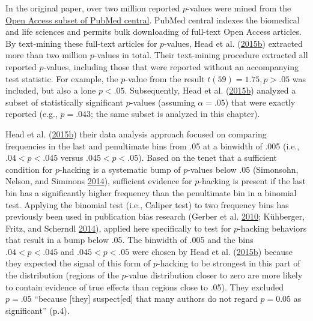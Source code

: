 \documentclass[a5paper]{book}
\begin{document}
In the original paper, over two million reported \(p\)-values were mined
from the \href{https://www.ncbi.nlm.nih.gov/pmc/tools/openftlist/}{Open
Access subset of PubMed central}. PubMed central indexes the biomedical
and life sciences and permits bulk downloading of full-text Open Access
articles. By text-mining these full-text articles for \(p\)-values, Head
et al.
(\protect\hyperlink{ref-doi:10.1371ux2fjournal.pbio.1002106}{2015}\protect\hyperlink{ref-doi:10.1371ux2fjournal.pbio.1002106}{b})
extracted more than two million \(p\)-values in total. Their text-mining
procedure extracted all reported \(p\)-values, including those that were
reported without an accompanying test statistic. For example, the
\(p\)-value from the result \(t(59)=1.75,p>.05\) was included, but also
a lone \(p<.05\). Subsequently, Head et al.
(\protect\hyperlink{ref-doi:10.1371ux2fjournal.pbio.1002106}{2015}\protect\hyperlink{ref-doi:10.1371ux2fjournal.pbio.1002106}{b})
analyzed a subset of statistically significant \(p\)-values (assuming
\(\alpha=.05\)) that were exactly reported (e.g., \(p=.043\); the same
subset is analyzed in this chapter).

Head et al.
(\protect\hyperlink{ref-doi:10.1371ux2fjournal.pbio.1002106}{2015}\protect\hyperlink{ref-doi:10.1371ux2fjournal.pbio.1002106}{b})
their data analysis approach focused on comparing frequencies in the
last and penultimate bins from .05 at a binwidth of .005 (i.e.,
\(.04<p< .045\) versus \(.045<p<.05\)). Based on the tenet that a
sufficient condition for \(p\)-hacking is a systematic bump of
\(p\)-values below .05 (Simonsohn, Nelson, and Simmons
\protect\hyperlink{ref-doi:10.1037ux2fa0033242}{2014}), sufficient
evidence for \(p\)-hacking is present if the last bin has a
significantly higher frequency than the penultimate bin in a binomial
test. Applying the binomial test (i.e., Caliper test) to two frequency
bins has previously been used in publication bias research (Gerber et
al. \protect\hyperlink{ref-doi:10.1177ux2f1532673x09350979}{2010};
Kühberger, Fritz, and Scherndl
\protect\hyperlink{ref-doi:10.1371ux2fjournal.pone.0105825}{2014}),
applied here specifically to test for \(p\)-hacking behaviors that
result in a bump below .05. The binwidth of .005 and the bins
\(.04<p<.045\) and \(.045<p<.05\) were chosen by Head et al.
(\protect\hyperlink{ref-doi:10.1371ux2fjournal.pbio.1002106}{2015}\protect\hyperlink{ref-doi:10.1371ux2fjournal.pbio.1002106}{b})
because they expected the signal of this form of \(p\)-hacking to be
strongest in this part of the distribution (regions of the \(p\)-value
distribution closer to zero are more likely to contain evidence of true
effects than regions close to .05). They excluded \(p=.05\)
\enquote{because {[}they{]} suspect{[}ed{]} that many authors do not
regard \(p=0.05\) as significant} (p.4).
\end{document}
